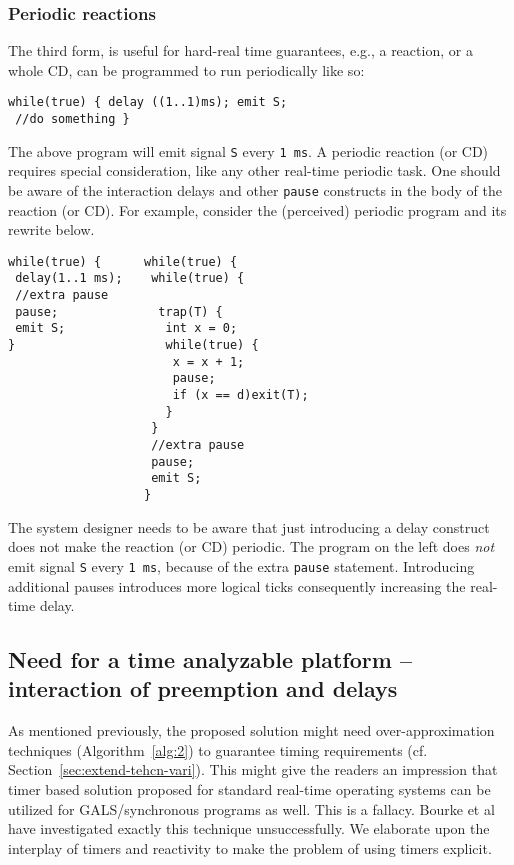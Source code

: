\subsubsection{Periodic reactions}
\label{sec:periodic-reactions}

The third form, is useful for hard-real time guarantees, e.g., a
reaction, or a whole CD, can be programmed to run periodically like so:

\begin{verbatim}
while(true) { delay ((1..1)ms); emit S; 
 //do something }
\end{verbatim}

The above program will emit signal \texttt{S} every \texttt{1 ms}. A
periodic reaction (or CD) requires special consideration, like any other
real-time periodic task. One should be aware of the interaction delays
and other \texttt{pause} constructs in the body of the reaction (or
CD). For example, consider the (perceived) periodic program and its
rewrite below.

\begin{verbatim}
while(true) {      while(true) {
 delay(1..1 ms);    while(true) { 
 //extra pause
 pause;              trap(T) {
 emit S;              int x = 0;
}                     while(true) {
                       x = x + 1;
                       pause;
                       if (x == d)exit(T);
                      }
                    }
                    //extra pause
                    pause;
                    emit S;
                   }
\end{verbatim}

The system designer needs to be aware that just introducing a delay
construct does not make the reaction (or CD) periodic. The program on
the left does \textit{not} emit signal \texttt{S} every \texttt{1 ms},
because of the extra \texttt{pause} statement. Introducing additional
pauses introduces more logical ticks consequently increasing the
real-time delay.

\subsection{Need for a time analyzable platform -- interaction of
  preemption and delays}
\label{sec:inter-preempt-delays}

As mentioned previously, the proposed solution might need
over-approximation techniques (Algorithm~\ref{alg:2}) to guarantee
timing requirements (cf. Section~\ref{sec:extend-tehcn-vari}). This
might give the readers an impression that timer based solution proposed
for standard real-time operating systems can be utilized for
GALS/synchronous programs as well. This is a fallacy. Bourke et
al~\cite{Bourke2009a} have investigated exactly this technique
unsuccessfully. We elaborate upon the interplay of timers and reactivity
to make the problem of using timers explicit.

